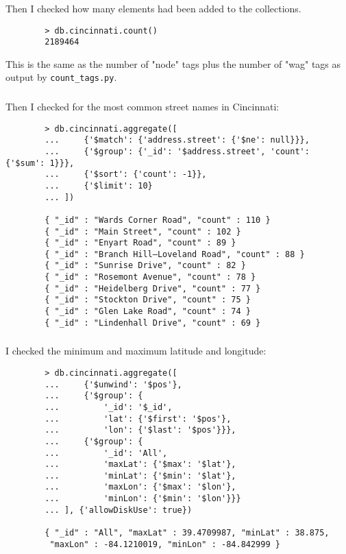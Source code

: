 \documentclass{article}
\begin{document}
        \subsubsection{}
        Then I checked how many elements had been added to the collections.

        \begin{lstlisting}
        > db.cincinnati.count()
        2189464
        \end{lstlisting}

        This is the same as the number of "node" tags plus the number of "wag"
        tags as output by \texttt{count\_tags.py}.

        \subsubsection{}
        Then I checked for the most common street names in Cincinnati:

        \begin{lstlisting}
        > db.cincinnati.aggregate([
        ...     {'$match': {'address.street': {'$ne': null}}},
        ...     {'$group': {'_id': '$address.street', 'count': {'$sum': 1}}},
        ...     {'$sort': {'count': -1}},
        ...     {'$limit': 10}
        ... ])

        { "_id" : "Wards Corner Road", "count" : 110 }
        { "_id" : "Main Street", "count" : 102 }
        { "_id" : "Enyart Road", "count" : 89 }
        { "_id" : "Branch Hill–Loveland Road", "count" : 88 }
        { "_id" : "Sunrise Drive", "count" : 82 }
        { "_id" : "Rosemont Avenue", "count" : 78 }
        { "_id" : "Heidelberg Drive", "count" : 77 }
        { "_id" : "Stockton Drive", "count" : 75 }
        { "_id" : "Glen Lake Road", "count" : 74 }
        { "_id" : "Lindenhall Drive", "count" : 69 }
        \end{lstlisting}

        \subsubsection{}
        I checked the minimum and maximum latitude and longitude:

        \begin{lstlisting}
        > db.cincinnati.aggregate([
        ...     {'$unwind': '$pos'},
        ...     {'$group': {
        ...         '_id': '$_id',
        ...         'lat': {'$first': '$pos'},
        ...         'lon': {'$last': '$pos'}}},
        ...     {'$group': {
        ...         '_id': 'All',
        ...         'maxLat': {'$max': '$lat'},
        ...         'minLat': {'$min': '$lat'},
        ...         'maxLon': {'$max': '$lon'},
        ...         'minLon': {'$min': '$lon'}}}
        ... ], {'allowDiskUse': true})

        { "_id" : "All", "maxLat" : 39.4709987, "minLat" : 38.875,
         "maxLon" : -84.1210019, "minLon" : -84.842999 }
        \end{lstlisting}
\end{document}
